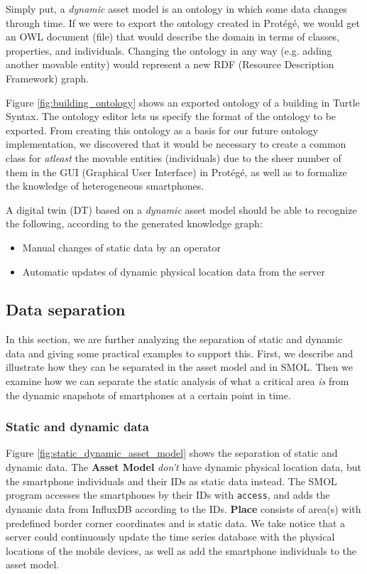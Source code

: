 \documentclass{article}
\begin{document}
Simply put, a \emph{dynamic} asset model is an ontology in which some data changes through time. If we were to export the ontology created in Protégé, we would get an OWL document (file) that would describe the domain in terms of classes, properties, and individuals. Changing the ontology in any way (e.g. adding another movable entity) would represent a new RDF (Resource Description Framework) graph.

Figure \ref{fig:building_ontology} shows an exported ontology of a building in Turtle Syntax. The ontology editor lets us specify the format of the ontology to be exported. From creating this ontology as a basis for our future ontology implementation, we discovered that it would be necessary to create a common class for \emph{atleast} the movable entities (individuals) due to the sheer number of them in the GUI (Graphical User Interface) in Protégé, as well as to formalize the knowledge of heterogeneous smartphones.

A digital twin (DT) based on a \emph{dynamic} asset model should be able to recognize the following, according to the generated knowledge graph:
\begin{itemize}
    \item Manual changes of static data by an operator
    \item Automatic updates of dynamic physical location data from the server
\end{itemize}
\subsection{Data separation}
In this section, we are further analyzing the separation of static and dynamic data and giving some practical examples to support this. First, we describe and illustrate how they can be separated in the asset model and in SMOL. Then we examine how we can separate the static analysis of what a critical area \emph{is} from the dynamic snapshots of smartphones at a certain point in time.

\subsubsection{Static and dynamic data}\label{subsubsec:StaticAndDynamicData}
Figure \ref{fig:static_dynamic_asset_model} shows the separation of static and dynamic data. The \textbf{Asset Model} \emph{don't} have dynamic physical location data, but the smartphone individuals and their IDs as static data instead. The SMOL program accesses the smartphones by their IDs with \verb|access|, and adds the dynamic data from InfluxDB according to the IDs. \textbf{Place} consists of area(s) with predefined border corner coordinates and is static data. We take notice that a server could continuously update the time series database with the physical locations of the mobile devices, as well as add the smartphone individuals to the asset model.
\end{document}
